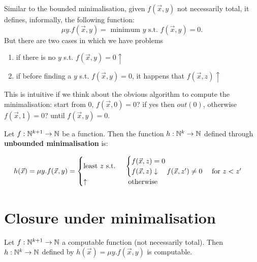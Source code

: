 Similar to the bounded minimalisation, given $f(\vec{x},y)$ not necessarily total, it defines, informally, the following function:
\[
  \mu y . f(\vec{x},y)  = \mbox{ minimum } y \mbox{ s.t. } f(\vec{x},y) = 0.
\]
But there are two cases in which we have problems
\begin{enumerate}
\item if there is no $y$ s.t. $f(\vec{x},y) = 0 \uparrow$
\item if before finding a $y$ s.t. $f(\vec{x},y) = 0$, it happens that $f(\vec{x},z)\uparrow$
\end{enumerate}
This is intuitive if we think about the obvious algorithm to compute the minimalisation: start from 0, $f(\vec{x},0) = 0$? if yes then $out(0)$, otherwise $f(\vec{x},1) = 0$? until $f(\vec{x},y) = 0$.

\begin{definition}
  Let $f : \mathbb{N}^{k+1}\rightarrow\mathbb{N}$ be a function. Then the function
  $h:\mathbb{N}^k\rightarrow\mathbb{N}$ defined through \textbf{unbounded
    minimalisation} is:

  \begin{equation*}
    h(\vec{x}) = \mu y. f(\vec{x},y) = \begin{cases}
      $least $ z$ s.t. $ & \begin{cases}
        f(\vec{x},z) = 0 \\
        f(\vec{x},z)\downarrow \quad f(\vec{x},z') \not= 0 \quad $ for $ z<z'
      \end{cases} \\
      \uparrow           & $ otherwise $
    \end{cases}
  \end{equation*}
\end{definition}

\section{Closure under minimalisation}

\begin{theorem}
  Let $f:\mathbb{N}^{k+1}\rightarrow\mathbb{N}$ a computable function (not necessarily total). Then $h:\mathbb{N}^k\rightarrow\mathbb{N}$ defined by $h(\vec{x}) = \mu y. f(\vec{x},y)$ is computable.
\end{theorem}

